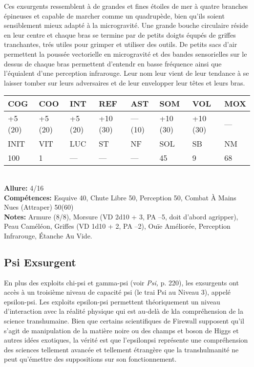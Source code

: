 Ces exsurgents ressemblent à de grandes et fines étoiles de mer à quatre branches épineuses et capable de marcher comme un quadrupède, bien qu'ils soient sensiblement mieux adapté à la microgravité. Une grande bouche circulaire réside en leur centre et chaque bras se termine par de petits doigts équpés de griffes tranchantes, trés utiles pour grimper et utiliser des outils. De petits sacs d'air permettent la poussée vectorielle en microgravité et des bandes sensorielles sur le dessus de chaque bras permettent d'entendr en basse fréquence ainsi que l'équialent d'une perception infrarouge. Leur nom leur vient de leur tendance à se laisser tomber sur leurs adversaires et de leur envelopper leur têtes et leurs bras. \\ \begin{tabular}{|l|l|l|l|l|l|l|l|} \hline

COG &COO &INT &REF &AST &SOM &VOL &MOX \\ \hline

+5 (20) &+5 (20) &+5 (20) &+10 (30) &— (10) &+10 (30) &+10 (30) &— \\ \hline

INIT &VIT &LUC &ST &NF &SOL &SB &NM \\ \hline

100 &1 &— &— &— &45 &9 &68 \\ \hline

\end{tabular} \\ \textbf{Allure:} 4/16 \\ \textbf{Compétences:} Esquive 40, Chute Libre 50, Perception 50, Combat À Mains Nues (Attraper) 50(60) \\ \textbf{Notes: }Armure (8/8), Morsure (VD 2d10 + 3, PA –5, doit d'abord agripper), Peau Caméléon, Griffes (VD 1d10 + 2, PA –2), Ouïe Améliorée, Perception Infrarouge, Étanche Au Vide. 



\subsection{Psi Exsurgent } 

En plus des exploits chi-psi et gamma-psi (voir \textit{Psi, } p. 220), les exsurgents ont accès à un troisième niveau de capacité psi (le trai Psi au Niveau 3), appelé epsilon-psi. Les exploits epsilon-psi permettent théoriquement un niveau d'interaction avec la réalité physique qui est au-delà de kla compréhension de la science transhumaine. Bien que certains scientifiques de Firewall supposent qu'il s'agit de manipulation de la matière noire ou des champs et boson de Higgs et autres idées exotiques, la vérité est que l'epsilonpsi représente une compréhension des sciences tellement avancée et tellement étrangère que la transhulmanité ne peut qu'émettre des suppositions sur son fonctionnement. 

